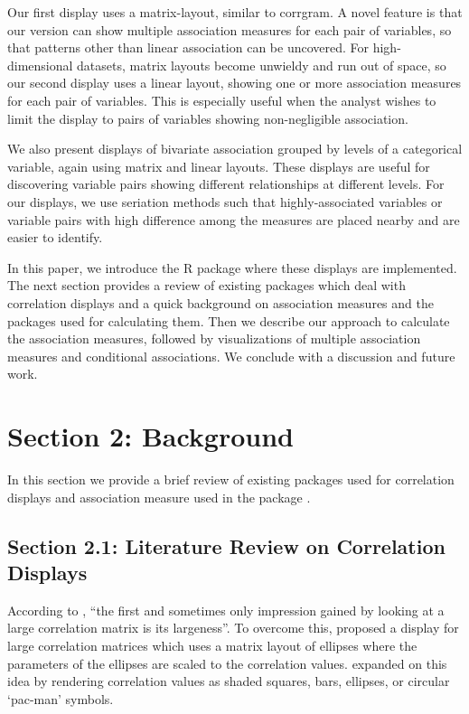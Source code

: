 Our first display uses a matrix-layout, similar to corrgram. A novel
feature is that our version can show multiple association measures for
each pair of variables, so that patterns other than linear association
can be uncovered. For high-dimensional datasets, matrix layouts become
unwieldy and run out of space, so our second display uses a linear
layout, showing one or more association measures for each pair of
variables. This is especially useful when the analyst wishes to limit
the display to pairs of variables showing non-negligible association.

We also present displays of bivariate association grouped by levels of a
categorical variable, again using matrix and linear layouts. These
displays are useful for discovering variable pairs showing different
relationships at different levels. For our displays, we use seriation
methods such that highly-associated variables or variable pairs with
high difference among the measures are placed nearby and are easier to
identify.

In this paper, we introduce the R package  where these
displays are implemented. The next section provides a review of existing
packages which deal with correlation displays and a quick background on
association measures and the packages used for calculating them. Then we
describe our approach to calculate the association measures, followed by
visualizations of multiple association measures and conditional
associations. We conclude with a discussion and future work.

\hypertarget{section-2-background}{%
\section{Section 2: Background}\label{section-2-background}}

In this section we provide a brief review of existing packages used for
correlation displays and association measure used in the package
.

\hypertarget{section-2.1-literature-review-on-correlation-displays}{%
\subsection{Section 2.1: Literature Review on Correlation
Displays}\label{section-2.1-literature-review-on-correlation-displays}}

According to \citet{hills1969looking}, ``the first and sometimes only
impression gained by looking at a large correlation matrix is its
largeness''. To overcome this, \citet{murdoch1996graphical} proposed a
display for large correlation matrices which uses a matrix layout of
ellipses where the parameters of the ellipses are scaled to the
correlation values. \citet{friendly2002corrgrams} expanded on this idea
by rendering correlation values as shaded squares, bars, ellipses, or
circular `pac-man' symbols.

